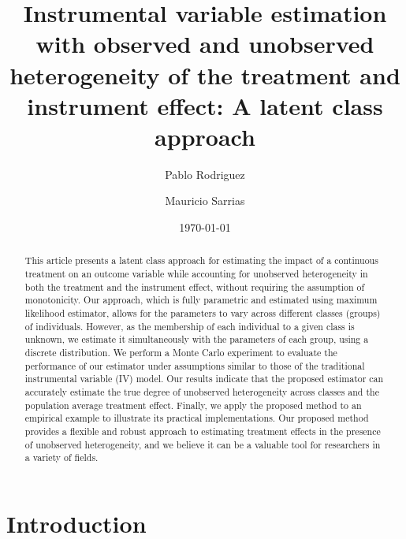 \documentclass[12pt]{article}
\begin{document}
\title{Instrumental variable estimation with observed and unobserved heterogeneity of the treatment and instrument effect: A latent class approach}

\author[1]{Pablo Rodriguez}
\author[2]{Mauricio Sarrias}




\date{\today}
\maketitle
\vspace{-0.2in}
\begin{abstract}
This article presents a latent class approach for estimating the impact of a continuous treatment on an outcome variable while accounting for unobserved heterogeneity in both the treatment and the instrument effect, without requiring the assumption of monotonicity. Our approach, which is fully parametric and estimated using maximum likelihood estimator, allows for the parameters to vary across different classes (groups) of individuals. However, as the membership of each individual to a given class is unknown, we estimate it simultaneously with the parameters of each group, using a discrete distribution. We perform a Monte Carlo experiment to evaluate the performance of our estimator under assumptions similar to those of the traditional instrumental variable (IV) model. Our results indicate that the proposed estimator can accurately estimate the true degree of unobserved heterogeneity across classes and the population average treatment effect.  Finally, we apply the proposed method to an empirical example to illustrate its practical implementations. Our proposed method provides a flexible and robust approach to estimating treatment effects in the presence of unobserved heterogeneity, and we believe it can be a valuable tool for researchers in a variety of fields. 
\thispagestyle{empty}
\end{abstract}

\newpage
{}

\section{Introduction}
\end{document}
